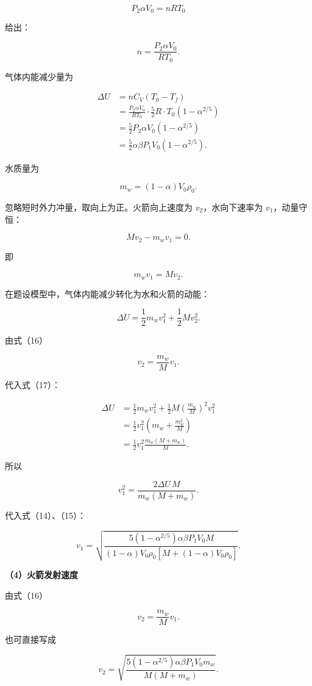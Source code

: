 \documentclass[12pt,a4paper,UTF8]{ctexart}
\begin{document}
\[
P_2\alpha V_0=nRT_0
\]

给出：

\[
n=\frac{P_2\alpha V_0}{RT_0}.
\tag{13}
\]

气体内能减少量为

\[
\begin{aligned}
\Delta U
&=nC_V(T_0-T_f)\\
&=\frac{P_2\alpha V_0}{RT_0}
\cdot\frac52R
\cdot T_0(1-\alpha^{2/5})\\
&=\frac52P_2\alpha V_0(1-\alpha^{2/5})\\
&=\frac52\alpha\beta P_1V_0(1-\alpha^{2/5}).
\end{aligned}
\tag{14}
\]

水质量为

\[
m_w=(1-\alpha)V_0\rho_0.
\tag{15}
\]

忽略短时外力冲量，取向上为正。火箭向上速度为 \(v_2\)，水向下速率为
\(v_1\)，动量守恒：

\[
Mv_2-m_wv_1=0.
\]

即

\[
m_wv_1=Mv_2.
\tag{16}
\]

在题设模型中，气体内能减少转化为水和火箭的动能：

\[
\Delta U
=\frac12m_wv_1^2+\frac12Mv_2^2.
\tag{17}
\]

由式（16）

\[
v_2=\frac{m_w}{M}v_1.
\tag{18}
\]

代入式（17）：

\[
\begin{aligned}
\Delta U
&=\frac12m_wv_1^2
+\frac12M\left(\frac{m_w}{M}\right)^2v_1^2\\
&=\frac12v_1^2
\left(m_w+\frac{m_w^2}{M}\right)\\
&=\frac12v_1^2
\frac{m_w(M+m_w)}{M}.
\end{aligned}
\]

所以

\[
v_1^2
=\frac{2\Delta U\,M}{m_w(M+m_w)}.
\tag{19}
\]

代入式（14）、（15）：

\[
\boxed{
v_1=
\sqrt{
\frac{
5(1-\alpha^{2/5})\alpha\beta P_1V_0M
}{
(1-\alpha)V_0\rho_0
\left[M+(1-\alpha)V_0\rho_0\right]
}
}
}.
\tag{20}
\]

\textbf{（4）火箭发射速度}

由式（16）

\[
v_2=\frac{m_w}{M}v_1.
\]

也可直接写成

\[
\boxed{
v_2=
\sqrt{
\frac{
5(1-\alpha^{2/5})\alpha\beta P_1V_0m_w
}{
M(M+m_w)
}
}
}.
\tag{21}
\]
\end{document}

